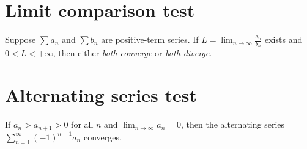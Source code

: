 \documentclass[a4paper,twocolumn,10pt]{article}
\begin{document}
  \section{Limit comparison test}
  Suppose $\sum a_n$ and $\sum b_n$ are positive-term series. If $L =
  \lim_{n\to\infty}{\frac{a_n}{b_n}}$ exists and $0<L<+\infty$, then either
  \textit{both converge} or \textit{both diverge}.

  \section{Alternating series test}
  If $a_n > a_{n+1} > 0$ for all $n$ and $\lim_{n\to\infty}{a_n} = 0$, then the
  alternating series $\sum_{n=1}^{\infty} (-1)^{n+1} a_n$ converges.
\end{document}
